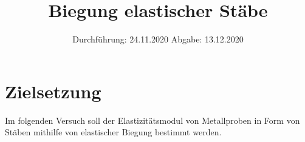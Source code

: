 

\subject{V103}
\title{Biegung elastischer Stäbe}
\date{
    Durchführung: 24.11.2020
    \hspace{3em}
    Abgabe: 13.12.2020
}



\maketitle
\thispagestyle{empty}
\tableofcontents
\newpage


\section{Zielsetzung} \label{sec:Ziel}

    Im folgenden Versuch soll der Elastizitätsmodul von Metallproben in Form von
    Stäben mithilfe von elastischer Biegung bestimmt werden.


\newpage


\newpage


\newpage


\newpage

\printbibliography


